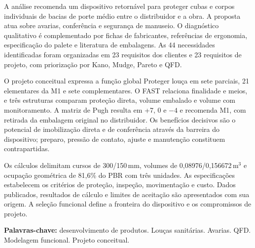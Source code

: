 \begin{resumorelatorio}
A análise recomenda um dispositivo retornável para proteger cubas e corpos individuais de bacias de porte médio entre o distribuidor e a obra. A proposta atua sobre avarias, conferência e segurança de manuseio. O diagnóstico qualitativo é complementado por fichas de fabricantes, referências de ergonomia, especificação do palete e literatura de embalagens. As 44 necessidades identificadas foram organizadas em 23 requisitos dos clientes e 23 requisitos de projeto, com priorização por Kano, Mudge, Pareto e QFD.

\vspace{0.5\baselineskip}
O projeto conceitual expressa a função global Proteger louça em sete parciais, 21 elementares da M1 e sete complementares. O FAST relaciona finalidade e meios, e três estruturas comparam proteção direta, volume embalado e volume com monitoramento. A matriz de Pugh resulta em +7, 0 e $-4$ e recomenda M1, com retirada da embalagem original no distribuidor. Os benefícios decisivos são o potencial de imobilização direta e de conferência através da barreira do dispositivo; preparo, pressão de contato, ajuste e manutenção constituem contrapartidas.

\vspace{0.5\baselineskip}
Os cálculos delimitam cursos de 300/150\,mm, volumes de 0,08976/0,156672\,m$^3$ e ocupação geométrica de 81,6\% do PBR com três unidades. As especificações estabelecem os critérios de proteção, inspeção, movimentação e custo. Dados publicados, resultados de cálculo e limites de aceitação são apresentados com sua origem. A seleção funcional define a fronteira do dispositivo e os compromissos de projeto.

\vspace{0.5\baselineskip}
\noindent\textbf{Palavras-chave:} desenvolvimento de produtos. Louças sanitárias. Avarias. QFD. Modelagem funcional. Projeto conceitual.
\end{resumorelatorio}

\clearpage

